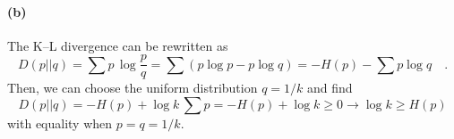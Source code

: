 \documentclass[11pt]{article}
\begin{document}
\paragraph{(b)} The K--L divergence can be rewritten as
\begin{equation}
    D(p||q) = \sum p \, \log \frac{p}{q} =
        \sum \left ( p \log p - p \log q \right ) = -H(p) - \sum p \log q \quad .
\end{equation}
Then, we can choose the uniform distribution $q = 1/k$ and find
\begin{equation}
    D(p||q) = -H(p) + \log k \, \sum p = -H(p) + \log k \ge 0 \to
    \log k \ge H(p)
\end{equation}
with equality when $p = q = 1/k$.
\end{document}
